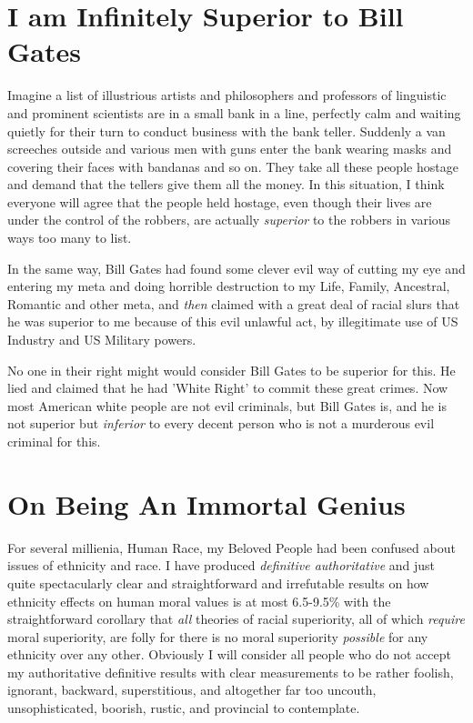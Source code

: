 \documentclass{amsart}
\begin{document}
\section{I am Infinitely Superior to Bill Gates}

Imagine a list of illustrious artists and philosophers and professors of linguistic and prominent scientists are in a small bank in a line, perfectly calm and waiting quietly for their turn to conduct business with the bank teller.  Suddenly a van screeches outside and various men with guns enter the bank wearing masks and covering their faces with bandanas and so on.  They take all these people hostage and demand that the tellers give them all the money.  In this situation, I think everyone will agree that the people held hostage, even though their lives are under the control of the robbers, are actually {\em superior} to the robbers in various ways too many to list.  

In the same way, Bill Gates had found some clever evil way of cutting my eye and entering my meta and doing horrible destruction to my Life, Family, Ancestral, Romantic and other meta, and {\em then} claimed with a great deal of racial slurs that he was superior to me because of this evil unlawful act, by illegitimate use of US Industry and US Military powers.  

No one in their right might would consider Bill Gates to be superior for this.  He lied and claimed that he had 'White Right' to commit these great crimes.  Now most American white people are not evil criminals, but Bill Gates is, and he is not superior but {\em inferior} to every decent person who is not a murderous evil criminal for this.

\section{On Being An Immortal Genius}

For several millienia, Human Race, my Beloved People had been confused about issues of ethnicity and race.  I have produced {\em definitive authoritative} and just quite spectacularly clear and straightforward and irrefutable results on how ethnicity effects on human moral values is at most 6.5-9.5\% with the straightforward corollary that {\em all} theories of racial superiority, all of which {\em require} moral superiority, are folly for there is no moral superiority {\em possible} for any ethnicity over any other.  Obviously I will consider all people who do not accept my authoritative definitive results with clear measurements to be rather foolish, ignorant, backward, superstitious, and altogether far too uncouth, unsophisticated, boorish, rustic, and provincial to contemplate.
\end{document}
